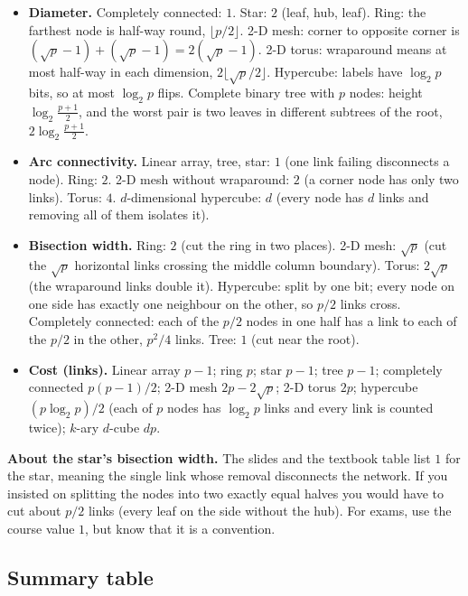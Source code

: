\begin{itemize}
  \item \textbf{Diameter.} Completely connected: $1$. Star: $2$ (leaf, hub, leaf). Ring: the farthest node is half-way round, $\lfloor p/2\rfloor$.
        2-D mesh: corner to opposite corner is $(\sqrt p-1)+(\sqrt p-1)=2(\sqrt p-1)$. 2-D torus: wraparound means at most half-way in each
        dimension, $2\lfloor\sqrt p/2\rfloor$. Hypercube: labels have $\log_2 p$ bits, so at most $\log_2 p$ flips. Complete binary tree with $p$ nodes:
        height $\log_2\frac{p+1}{2}$, and the worst pair is two leaves in different subtrees of the root, $2\log_2\frac{p+1}{2}$.
  \item \textbf{Arc connectivity.} Linear array, tree, star: $1$ (one link failing disconnects a node). Ring: $2$. 2-D mesh without wraparound: $2$ (a corner node has only two links).
        Torus: $4$. $d$-dimensional hypercube: $d$ (every node has $d$ links and removing all of them isolates it).
  \item \textbf{Bisection width.} Ring: $2$ (cut the ring in two places). 2-D mesh: $\sqrt p$ (cut the $\sqrt p$ horizontal links crossing the middle column boundary). Torus: $2\sqrt p$ (the
        wraparound links double it). Hypercube: split by one bit; every node on one side has exactly one neighbour on the other, so $p/2$ links cross.
        Completely connected: each of the $p/2$ nodes in one half has a link to each of the $p/2$ in the other, $p^2/4$ links. Tree: $1$ (cut near the root).
  \item \textbf{Cost (links).} Linear array $p-1$; ring $p$; star $p-1$; tree $p-1$; completely connected $p(p-1)/2$; 2-D mesh $2p-2\sqrt p$; 2-D torus $2p$;
        hypercube $(p\log_2 p)/2$ (each of $p$ nodes has $\log_2 p$ links and every link is counted twice); $k$-ary $d$-cube $dp$.
\end{itemize}

\begin{pitfall}
\textbf{About the star's bisection width.} The slides and the textbook table list $1$ for the star, meaning the single link whose removal disconnects the network. If you insisted on splitting
the nodes into two exactly equal halves you would have to cut about $p/2$ links (every leaf on the side without the hub). For exams, use the course value $1$,
but know that it is a convention.
\end{pitfall}

\subsection{Summary table}
\label{sec:summarytable}


